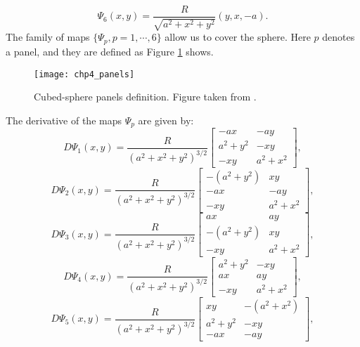 \begin{equation}
	\label{chp3-eqdistant-psi6}
	\Psi_{6}(x,y) = \frac{R}{\sqrt{a^2 + x^2 + y^2}}(y, x, -a).
\end{equation}
The family of maps $\{\Psi_{p}, p = 1, \cdots, 6\}$ allow us to cover the sphere.
Here $p$ denotes a panel, and they are defined as Figure \ref{chp4-panels} shows.
\begin{figure}[!htb]
	\centering
		\texttt{[image: chp4\_panels]}
	\caption{Cubed-sphere panels definition. Figure taken from \citet{ronchi:1996}.\label{chp4-panels}}
\end{figure}
The derivative of the maps $\Psi_p$ are given by:
\begin{equation}
	\label{chp3-eqdistant-dpsi1}
	D\Psi_{1}(x,y) = \frac{R}{{(a^2 + x^2 + y^2)}^{3/2}}
	\begin{bmatrix}
		-ax & -ay \\
	 	 a^2+y^2  & -xy \\
		 -xy  & a^2+x^2
	\end{bmatrix},
\end{equation}
\begin{equation}
	\label{chp3-eqdistant-dpsi2}
	D\Psi_{2}(x,y) = \frac{R}{{(a^2 + x^2 + y^2)}^{3/2}}
	\begin{bmatrix}
		-(a^2+y^2) & xy \\
		 -ax &  -ay \\
		 -xy &  a^2+x^2
	\end{bmatrix},
\end{equation}
\begin{equation}
	\label{chp3-eqdistant-dpsi3}
	D\Psi_{3}(x,y) = \frac{R}{{(a^2 + x^2 + y^2)}^{3/2}}
	\begin{bmatrix}
		 ax &  ay \\
		-(a^2+y^2) & xy \\
		 -xy &  a^2+x^2
	\end{bmatrix},
\end{equation}
\begin{equation}
	\label{chp3-eqdistant-dpsi4}
	D\Psi_{4}(x,y) = \frac{R}{{(a^2 + x^2 + y^2)}^{3/2}}	
	\begin{bmatrix}
		 a^2+y^2 &  -xy \\
		 ax & ay \\
		 -xy &  a^2+x^2
	\end{bmatrix},
\end{equation}
\begin{equation}
	\label{chp3-eqdistant-dpsi5}
	D\Psi_{5}(x,y) = \frac{R}{{(a^2 + x^2 + y^2)}^{3/2}}	
	\begin{bmatrix}
		 xy  & -(a^2+x^2) \\
	 	 a^2+y^2  &  -xy \\
		-ax & -ay
	\end{bmatrix},
\end{equation}
